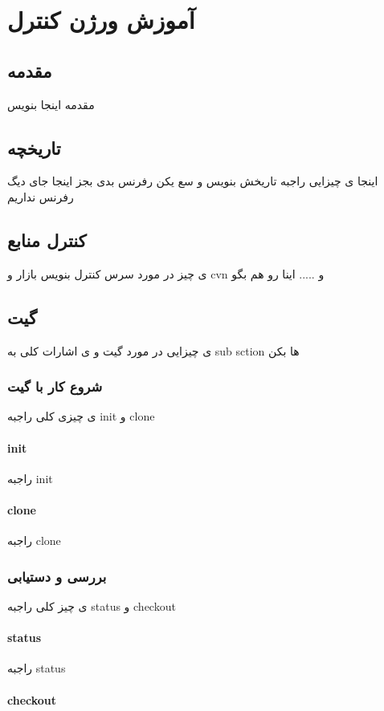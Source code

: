 \chapter{آموزش ورژن کنترل}




\section{مقدمه}
مقدمه اینجا بنویس
\section{تاریخچه}
اینجا ی چیزایی راجبه تاریخش بنویس و سع یکن رفرنس بدی بجز اینجا جای دیگ رفرنس نداریم 
\section{کنترل منابع }
ی چیز در مورد سرس کنترل بنویس بازار و cvn و ..... اینا رو هم بگو 



\section{گیت }
ی چیزایی در مورد گیت و ی اشارات کلی به sub sction ها بکن 
\subsection{شروع کار با گیت}
ی چیزی کلی راجبه init و clone 
\subsubsection{init}
راجبه init 
\subsubsection{clone}
راجبه clone
\subsection{بررسی و دستیابی}
ی چیز کلی راجبه status و checkout 
\subsubsection{status}
راجبه status 
\subsubsection{checkout}